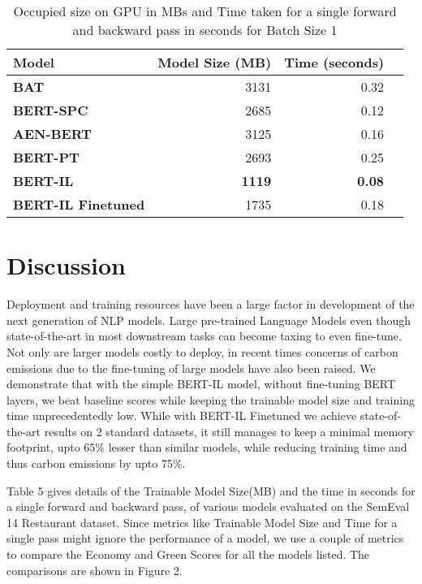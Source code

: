 \documentclass[11pt,a4paper]{article}
\begin{document}
\begin{table*}[!htp]\centering
\begin{tabular}{lrrr}\toprule
\textbf{Model} &\textbf{Model Size (MB)} &\textbf{Time (seconds)} \\\midrule
\textbf{BAT} &{3131} &{0.32} \\
\textbf{BERT-SPC} &{2685} &{0.12} \\
\textbf{AEN-BERT} &{3125} &{0.16} \\
\textbf{BERT-PT} &{2693} &{0.25} \\
\textbf{BERT-IL} &\textbf{1119} &\textbf{0.08} \\
\textbf{BERT-IL Finetuned} &{1735} &{0.18} \\
\bottomrule
\end{tabular}
\caption{Occupied size on GPU in MBs and Time taken for a single forward and backward pass  in seconds for Batch Size 1}\label{tab: }

\end{table*}

\section{Discussion}





Deployment and training resources have been a large factor in development of the next generation of NLP models. Large pre-trained Language Models even though state-of-the-art in most downstream tasks can become taxing to even fine-tune. Not only are larger models costly to deploy, in recent times concerns of carbon emissions due to the fine-tuning of large models have also been raised. We demonstrate that with the simple BERT-IL model, without fine-tuning BERT layers, we beat baseline scores while keeping the trainable model size and training time unprecedentedly low. While with BERT-IL Finetuned we achieve state-of-the-art results on 2 standard datasets, it still manages to keep a minimal memory footprint, upto 65\% lesser than similar models, while reducing training time and thus carbon emissions by upto 75\%. 

Table 5 gives details of the Trainable Model Size(MB) and the time in seconds for a single forward and backward pass, of various models evaluated on the SemEval 14 Restaurant dataset. Since metrics like Trainable Model Size and Time for a single pass might ignore the performance of a model, we use a couple of metrics to compare the Economy and Green Scores for all the models listed. The comparisons are shown in Figure 2. 
\end{document}
